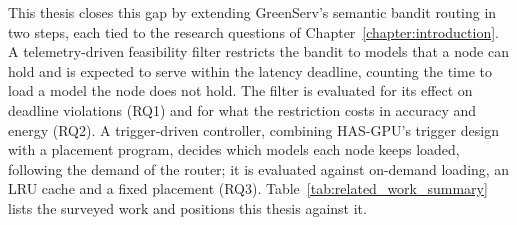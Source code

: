 This thesis closes this gap by extending GreenServ's semantic bandit routing in two steps, each tied to the research questions of Chapter~\ref{chapter:introduction}.
A telemetry-driven feasibility filter restricts the bandit to models that a node can hold and is expected to serve within the latency deadline, counting the time to load a model the node does not hold.
The filter is evaluated for its effect on deadline violations (RQ1) and for what the restriction costs in accuracy and energy (RQ2).
A trigger-driven controller, combining HAS-GPU's trigger design with a placement program, decides which models each node keeps loaded, following the demand of the router;
it is evaluated against on-demand loading, an LRU cache and a fixed placement (RQ3).
Table~\ref{tab:related_work_summary} lists the surveyed work and positions this thesis against it.


